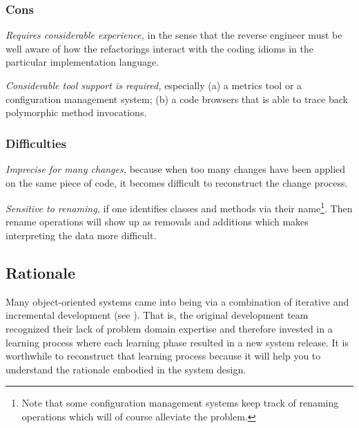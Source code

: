 \documentclass[a4paper,10pt,twoside]{book}
\begin{document}
\subsubsection*{Cons}

\begin{bulletlist}
\item \emph{Requires considerable experience,}
in the sense that the reverse engineer must be well aware of how the refactorings interact with the coding idioms in the particular implementation language.

\item \emph{Considerable tool support is required,}
especially (a) a metrics tool or a configuration management system; (b) a code browsers that is able to trace back polymorphic method invocations.
\end{bulletlist}

\subsubsection*{Difficulties}

\begin{bulletlist}
\item \emph{Imprecise for many changes,}
because when too many changes have been applied on the same piece of code, it becomes difficult to reconstruct the change process.

\item \emph{Sensitive to renaming,}
if one identifies classes and methods via their name\footnote{Note that some configuration management systems keep track of renaming operations which will of course alleviate the problem.}. Then rename operations will show up as removals and additions which makes interpreting the data more difficult.
\end{bulletlist}


\subsection*{Rationale}

Many object-oriented systems came into being via a combination of iterative and incremental development (see \cite{Booc94a} \cite{Gold95a} \cite{Jaco97a} \cite{Reen96a}). That is, the original development team recognized their lack of problem domain expertise and therefore invested in a learning process where each learning phase resulted in a new system release. It is worthwhile to reconstruct that learning process because it will help you to understand the rationale embodied in the system design.
\end{document}
